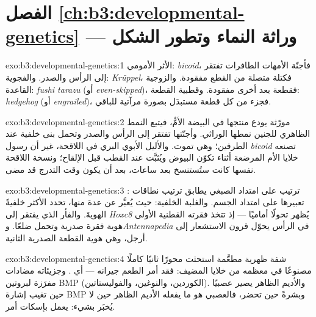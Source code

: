\section*{الفصل \ref{ch:b3:developmental-genetics} --- وراثة النماء وتطور الشكل}

\begin{solution}{exo:b3:developmental-genetics:1}
الأثر الأمومي: \emph{bicoid}، فأجنّة الأمهات الطافرات تفتقر
إلى الرأس والصدر. والفجوية: \emph{Krüppel}، فكتلة متصلة من
القطع مفقودة. والزوجية القاعدة: \emph{fushi tarazu} (أو
\emph{even-skipped})، فقطعة بعد أخرى مفقودة. وقطبية القطعة:
\emph{hedgehog} (أو \emph{engrailed})، فجزء من كل قطعة
مستبدَل بصورة مرآتية للباقي.
\end{solution}

\begin{solution}{exo:b3:developmental-genetics:2}
مورّثة يودع منتجها في البيضة الأمُّ، فيتبع النمط الظاهري
للجنين نمطها الوراثي. وأجنّتها تفتقر إلى الرأس والصدر وتحمل
بنى خلفية عند الطرفين؛ وهي تموت. والأليل الأبوي البري في
اللاقحة، غير أن رسول \emph{bicoid} تصنعه خلايا الأم المرضعة
أثناء تكوّن البيوض ويُثبَّت عند القطب قبل الإلقاح؛ ونسخة
اللاقحة نفسها كانت ستُستنسخ بعد ساعات، بعد أن يكون وقت
التدرج قد مضى.
\end{solution}

\begin{solution}{exo:b3:developmental-genetics:3}
: ترتيب  على امتداد الصبغي يطابق
ترتيب نطاقات تعبيرها على امتداد الجسم. والغلبة الخلفية: حيث
يُعبَّر عن عدة منها، تحدد الأكثر خلفيةً الهويةَ. والفأر
الذي يفتقر إلى \emph{Hoxc8} يُظهر تحولًا أماميًا --- إذ تتخذ
فقرته القطنية الأولى هوية فقرة صدرية وتحمل ضلعًا. و\emph{Antennapedia}
في الرأس يحوّل قرون الاستشعار إلى أرجل، وهي هوية القطعة
الصدرية الثانية.
\end{solution}

\begin{solution}{exo:b3:developmental-genetics:4}
شفة ظهرية مطعَّمة استحثت محورًا ثانيًا كاملًا مصنوعًا في
معظمه من خلايا المضيف: فقد أمر الطعم جيرانه --- أي .
وجزيئاته مضادات مفرَزة لبروتين BMP (الكوردين، والنوغين،
والفوليستاتين). والأديم الظاهر يصير عصبيًا حين تغيب إشارة
BMP وبشرةً حين تحضر، فالعصبي هو ما يفعله الأديم الظاهر حين
لا يُخبَر بشيء:  يعمل بإسكات أمر.
\end{solution}

